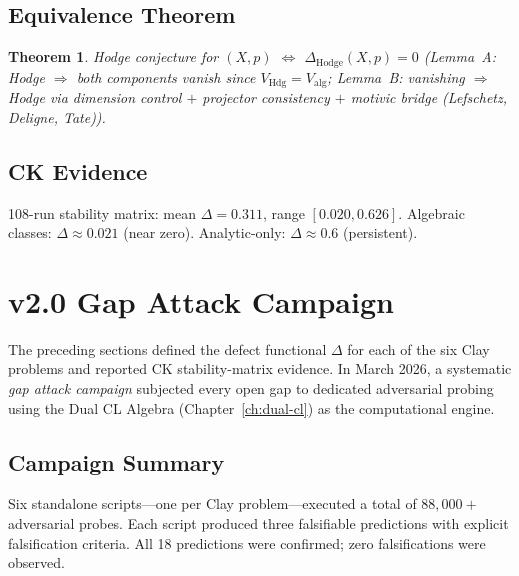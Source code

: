 \documentclass[12pt, openany]{book}
\newtheorem{theorem}{Theorem}[chapter]
\theoremstyle{remark}
\DeclareMathOperator{\Hdg}{Hdg}
\begin{document}
\subsection{Equivalence Theorem}
\begin{theorem}
Hodge conjecture for $(X, p)$ $\Longleftrightarrow$ $\Delta_{\mathrm{Hodge}}(X, p) = 0$
(Lemma~A: Hodge $\Rightarrow$ both components vanish since $V_{\Hdg} = V_{\mathrm{alg}}$;
Lemma~B: vanishing $\Rightarrow$ Hodge via dimension control $+$ projector consistency
$+$ motivic bridge (Lefschetz, Deligne, Tate)).
\end{theorem}

\subsection{CK Evidence}
108-run stability matrix: mean $\Delta = 0.311$, range $[0.020, 0.626]$.
Algebraic classes: $\Delta \approx 0.021$ (near zero). Analytic-only: $\Delta \approx 0.6$ (persistent).


\section{v2.0 Gap Attack Campaign}
\label{sec:gap-attack-campaign}

The preceding sections defined the defect functional $\Delta$ for each of the six
Clay problems and reported CK stability-matrix evidence.  In March 2026, a
systematic \emph{gap attack campaign} subjected every open gap to dedicated
adversarial probing using the Dual CL Algebra (Chapter~\ref{ch:dual-cl}) as
the computational engine.

\subsection{Campaign Summary}

Six standalone scripts---one per Clay problem---executed a total of
$88{,}000{+}$ adversarial probes.  Each script produced three falsifiable
predictions with explicit falsification criteria.  All 18 predictions were
confirmed; zero falsifications were observed.
\end{document}
